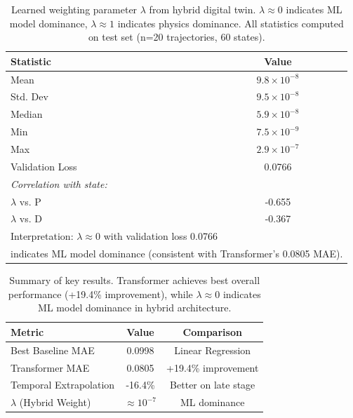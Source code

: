 \begin{table}[t]
\centering
\caption{Learned weighting parameter $\lambda$ from hybrid digital twin. $\lambda \approx 0$ indicates ML model dominance, $\lambda \approx 1$ indicates physics dominance. All statistics computed on test set (n=20 trajectories, 60 states).}
\label{tab:lambda_analysis}
\begin{tabular}{lc}
\toprule
\textbf{Statistic} & \textbf{Value} \\
\midrule
Mean & $9.8 \times 10^{-8}$ \\
Std. Dev & $9.5 \times 10^{-8}$ \\
Median & $5.9 \times 10^{-8}$ \\
Min & $7.5 \times 10^{-9}$ \\
Max & $2.9 \times 10^{-7}$ \\
\midrule
Validation Loss & 0.0766 \\
\midrule
\multicolumn{2}{l}{\textit{Correlation with state:}} \\
\quad $\lambda$ vs. P & -0.655 \\
\quad $\lambda$ vs. D & -0.367 \\
\bottomrule
\multicolumn{2}{l}{\footnotesize Interpretation: $\lambda \approx 0$ with validation loss 0.0766} \\
\multicolumn{2}{l}{\footnotesize indicates ML model dominance (consistent with Transformer's 0.0805 MAE).} \\
\end{tabular}
\end{table}


\begin{table}[t]
\centering
\caption{Summary of key results. Transformer achieves best overall performance (+19.4\% improvement), while $\lambda \approx 0$ indicates ML model dominance in hybrid architecture.}
\label{tab:summary}
\begin{tabular}{lcc}
\toprule
\textbf{Metric} & \textbf{Value} & \textbf{Comparison} \\
\midrule
Best Baseline MAE & 0.0998 & Linear Regression \\
Transformer MAE & 0.0805 & +19.4\% improvement \\
\midrule
Temporal Extrapolation & -16.4\% & Better on late stage \\
\midrule
$\lambda$ (Hybrid Weight) & $\approx 10^{-7}$ & ML dominance \\
\bottomrule
\end{tabular}
\end{table}

